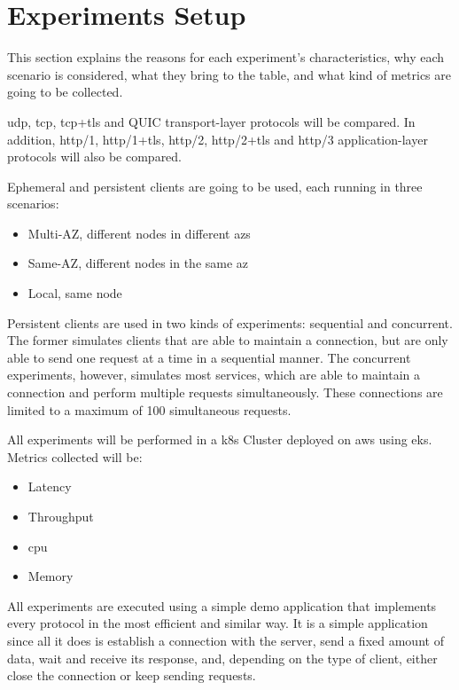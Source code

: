 \section{Experiments Setup}

This section explains the reasons for each experiment's characteristics, why each scenario is considered, what they bring to the table, and what kind of metrics are going to be collected.

\gls{udp}, \gls{tcp}, \gls{tcp}+\gls{tls} and QUIC transport-layer protocols will be compared. In addition, \gls{http}/1, \gls{http}/1+\gls{tls}, \gls{http}/2, \gls{http}/2+\gls{tls} and \gls{http}/3 application-layer protocols will also be compared.

Ephemeral and persistent clients are going to be used, each running in three scenarios:
\begin{itemize}
    \item Multi-AZ, different nodes in different \gls{az}s
    \item Same-AZ, different nodes in the same \gls{az}
    \item Local, same node
\end{itemize}

Persistent clients are used in two kinds of experiments: sequential and concurrent. The former simulates clients that are able to maintain a connection, but are only able to send one request at a time in a sequential manner. The concurrent experiments, however, simulates most services, which are able to maintain a connection and perform multiple requests simultaneously. These connections are limited to a maximum of 100 simultaneous requests.

All experiments will be performed in a \gls{k8s} Cluster deployed on \gls{aws} using \gls{eks}. Metrics collected will be:
\begin{itemize}
    \item Latency
    \item Throughput
    \item \gls{cpu}
    \item Memory
\end{itemize}

All experiments are executed using a simple demo application that implements every protocol in the most efficient and similar way. It is a simple application since all it does is establish a connection with the server, send a fixed amount of data, wait and receive its response, and, depending on the type of client, either close the connection or keep sending requests.

